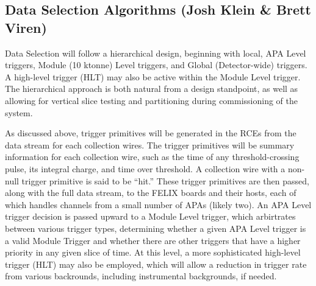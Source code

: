 

\subsection{Data Selection Algorithms (Josh Klein \& Brett Viren)}
\label{sec:fdsp-daq-sel}


	Data Selection will follow a hierarchical design, beginning with local,
APA Level triggers, Module (10 ktonne) Level triggers, and Global
(Detector-wide) triggers. A high-level trigger (HLT) may also be active within
the Module Level trigger.  The hierarchical approach is both natural from a
design standpoint, as well as allowing for vertical slice testing and
partitioning during commissioning of the system.

	As discussed above, trigger primitives will be generated in the RCEs
from the data stream for each collection wires.  The trigger primitives will be
summary information for each collection wire, such as the time of any
threshold-crossing pulse, its integral charge, and time over threshold.  A
collection wire with a non-null trigger primitive is said to be ``hit.''  These
trigger primitives are then passed, along with the full data stream, to the
FELIX boards and their hosts, each of which handles channels from a small
number of APAs (likely two).  An APA Level trigger decision is passed upward to
a Module Level trigger, which arbirtrates between various trigger types,
determining whether a given APA Level trigger is a valid Module Trigger and
whether there are other triggers that have a higher priority in any given slice
of time.  At this level, a more sophisticated high-level trigger (HLT) may also
be employed, which will allow a reduction in trigger rate from various
backrounds, including instrumental backgrounds, if needed. 

